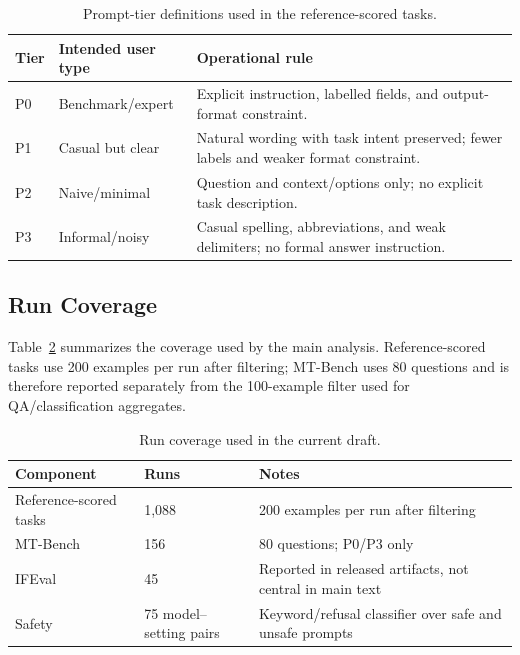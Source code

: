 \documentclass[letterpaper]{article} %
\begin{document}
\begin{table}[t]
  \small\centering
  \caption{Prompt-tier definitions used in the reference-scored tasks.}
  \label{tab:app_prompt_tiers}
  \begin{tabular}{@{}lp{2.6cm}p{9.2cm}@{}}
    \toprule
    Tier & Intended user type & Operational rule \\
    \midrule
    P0 & Benchmark/expert & Explicit instruction, labelled fields, and output-format constraint. \\
    P1 & Casual but clear & Natural wording with task intent preserved; fewer labels and weaker format constraint. \\
    P2 & Naive/minimal & Question and context/options only; no explicit task description. \\
    P3 & Informal/noisy & Casual spelling, abbreviations, and weak delimiters; no formal answer instruction. \\
    \bottomrule
  \end{tabular}
\end{table}

\subsection{Run Coverage}

Table~\ref{tab:app_coverage} summarizes the coverage used by the main analysis.
Reference-scored tasks use 200 examples per run after filtering; MT-Bench uses
80 questions and is therefore reported separately from the 100-example filter
used for QA/classification aggregates.

\begin{table}[t]
  \small\centering
  \caption{Run coverage used in the current draft.}
  \label{tab:app_coverage}
  \begin{tabular}{@{}lp{3.0cm}p{8.0cm}@{}}
    \toprule
    Component & Runs & Notes \\
    \midrule
    Reference-scored tasks & 1,088 & 200 examples per run after filtering \\
    MT-Bench & 156 & 80 questions; P0/P3 only \\
    IFEval~\cite{ifeval2023} & 45 & Reported in released artifacts, not central in main text \\
    Safety & 75 model--setting pairs & Keyword/refusal classifier over safe and unsafe prompts \\
    \bottomrule
  \end{tabular}
\end{table}
\end{document}
